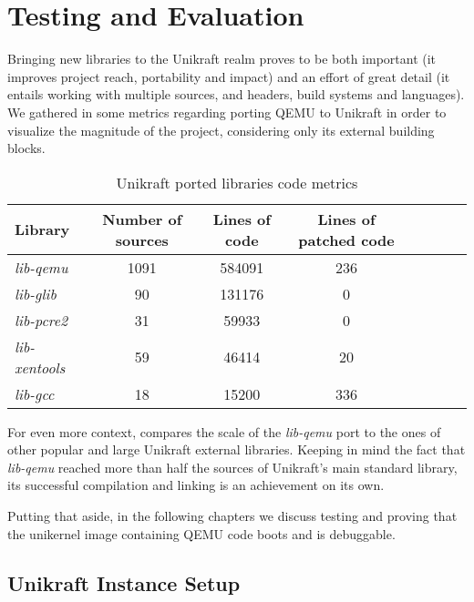 \chapter{Testing and Evaluation}
\label{chapter:testing-evaluation}

Bringing new libraries to the Unikraft realm proves to be both important (it improves project reach, portability and impact) and an effort of great detail (it entails working with multiple sources, and headers, build systems and languages).
We gathered in  some metrics regarding porting QEMU to Unikraft in order to visualize the magnitude of the project, considering only its external building blocks. 

\begin{center}
\begin{table}[htb]
  \caption{Unikraft ported libraries code metrics}
  \begin{tabular}{l*{6}{c}r}
    Library & Number of sources & Lines of code & Lines of patched code \\
    \hline
    \textit{lib-qemu} & 1091 & 584091 & 236  \\
    \textit{lib-glib} & 90 & 131176 & 0  \\
    \textit{lib-pcre2} & 31 & 59933 & 0 \\
    \textit{lib-xentools} & 59 & 46414 & 20 \\
    \textit{lib-gcc} & 18 & 15200 & 336 \\
  \end{tabular}
  \label{table:libraries-metrics}
\end{table}
\end{center}

For even more context,  compares the scale of the \textit{lib-qemu} port to the ones of other popular and large Unikraft external libraries.
Keeping in mind the fact that \textit{lib-qemu} reached more than half the sources of Unikraft's main standard library, its successful compilation and linking is an achievement on its own.

Putting that aside, in the following chapters we discuss testing and proving that the unikernel image containing QEMU code boots and is debuggable.


\section{Unikraft Instance Setup}
\label{sec:unikraft-instance-setup}

